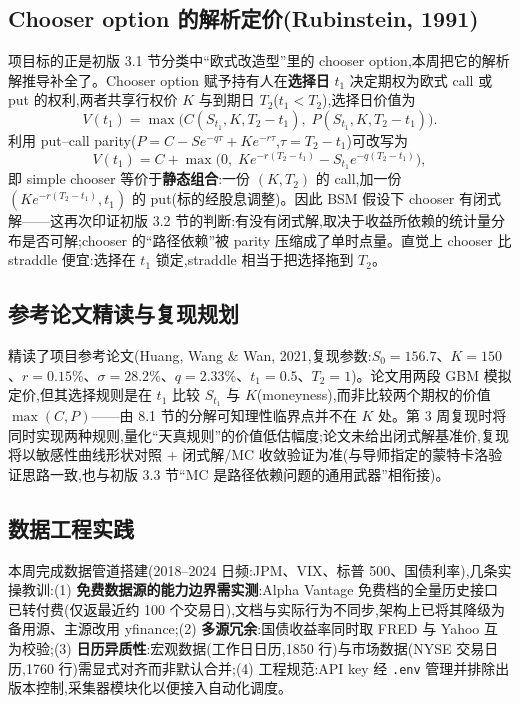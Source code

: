 \documentclass[11pt]{ctexart}
\begin{document}
\subsection{Chooser option 的解析定价(Rubinstein, 1991)}
项目标的正是初版 3.1 节分类中``欧式改造型''里的 chooser option,本周把它的解析解推导补全了。Chooser option 赋予持有人在\textbf{选择日} $t_1$ 决定期权为欧式 call 或 put 的权利,两者共享行权价 $K$ 与到期日 $T_2$($t_1 < T_2$),选择日价值为
\[
V(t_1) = \max\big( C(S_{t_1}, K, T_2 - t_1),\; P(S_{t_1}, K, T_2 - t_1) \big).
\]
利用 put--call parity($P = C - S e^{-q\tau} + K e^{-r\tau}$,$\tau = T_2 - t_1$)可改写为
\[
V(t_1) = C + \max\big( 0,\; K e^{-r(T_2 - t_1)} - S_{t_1} e^{-q(T_2-t_1)} \big),
\]
即 simple chooser 等价于\textbf{静态组合}:一份 $(K, T_2)$ 的 call,加一份 $(K e^{-r(T_2-t_1)}, t_1)$ 的 put(标的经股息调整)。因此 BSM 假设下 chooser 有闭式解——这再次印证初版 3.2 节的判断:有没有闭式解,取决于收益所依赖的统计量分布是否可解;chooser 的``路径依赖''被 parity 压缩成了单时点量。直觉上 chooser 比 straddle 便宜:选择在 $t_1$ 锁定,straddle 相当于把选择拖到 $T_2$。

\subsection{参考论文精读与复现规划}
精读了项目参考论文(Huang, Wang \& Wan, 2021,复现参数:$S_0=156.7$、$K=150$、$r=0.15\%$、$\sigma=28.2\%$、$q=2.33\%$、$t_1=0.5$、$T_2=1$)。论文用两段 GBM 模拟定价,但其选择规则是在 $t_1$ 比较 $S_{t_1}$ 与 $K$(moneyness),而非比较两个期权的价值 $\max(C,P)$——由 8.1 节的分解可知理性临界点并不在 $K$ 处。第 3 周复现时将同时实现两种规则,量化``天真规则''的价值低估幅度;论文未给出闭式解基准价,复现将以敏感性曲线形状对照 + 闭式解/MC 收敛验证为准(与导师指定的蒙特卡洛验证思路一致,也与初版 3.3 节``MC 是路径依赖问题的通用武器''相衔接)。

\subsection{数据工程实践}
本周完成数据管道搭建(2018--2024 日频:JPM、VIX、标普 500、国债利率),几条实操教训:(1) \textbf{免费数据源的能力边界需实测}:Alpha Vantage 免费档的全量历史接口已转付费(仅返最近约 100 个交易日),文档与实际行为不同步,架构上已将其降级为备用源、主源改用 yfinance;(2) \textbf{多源冗余}:国债收益率同时取 FRED 与 Yahoo 互为校验;(3) \textbf{日历异质性}:宏观数据(工作日日历,1850 行)与市场数据(NYSE 交易日历,1760 行)需显式对齐而非默认合并;(4) 工程规范:API key 经 \texttt{.env} 管理并排除出版本控制,采集器模块化以便接入自动化调度。
\end{document}
